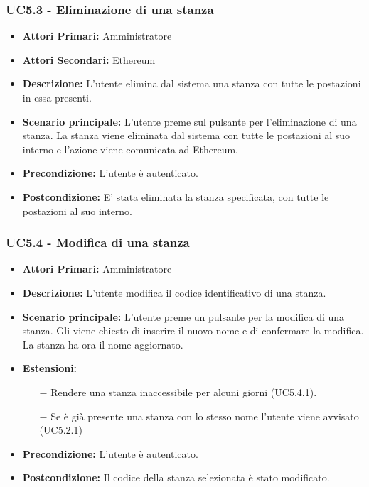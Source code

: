 \subsubsection{ UC5.3 - Eliminazione di una stanza}
\begin{itemize}
	\item\textbf{Attori Primari:}
	Amministratore 
	\item\textbf{Attori Secondari:}
	Ethereum
	\item\textbf{Descrizione:} 
	L'utente elimina dal sistema una stanza con tutte le postazioni in essa presenti.
	\item\textbf{Scenario principale:} 
	L'utente preme sul pulsante per l'eliminazione di una stanza. La stanza viene eliminata dal sistema con tutte le postazioni al suo interno e l'azione viene comunicata ad Ethereum.
	\item\textbf{Precondizione:} 
	L'utente è autenticato.
	\item\textbf{Postcondizione:}
	E' stata eliminata la stanza specificata, con tutte le postazioni al suo interno.
\end{itemize}

\subsubsection{ UC5.4 - Modifica di una stanza}
\begin{itemize}
	\item\textbf{Attori Primari:}
	Amministratore 
	\item\textbf{Descrizione:}
	L'utente modifica il codice identificativo di una stanza.
	\item\textbf{Scenario principale:} 
	L'utente preme un pulsante per la modifica di una stanza. Gli viene chiesto di inserire il nuovo nome e di confermare la modifica. La stanza ha ora il nome aggiornato.
	\item\textbf{Estensioni:}
	\begin{itemize}
		\item[$-$] Rendere una stanza inaccessibile per alcuni giorni (UC5.4.1).
		\item[$-$] Se è già presente una stanza con lo stesso nome l'utente viene avvisato (UC5.2.1)
	\end{itemize}
	\item\textbf{Precondizione:} 
	L'utente è autenticato.
	\item\textbf{Postcondizione:}
	Il codice della stanza selezionata è stato modificato.
\end{itemize}

